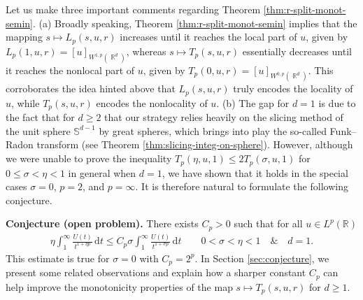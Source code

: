 \documentclass[12pt, reqno]{amsart}%
\theoremstyle{plain}  %
\theoremstyle{definition}  %
\theoremstyle{remark}
\numberwithin{equation}{section}
\DeclareMathOperator{\R}{\mathbb{R}}
\renewcommand{\d}{\,\mathrm{d}}
\begin{document}
Let us make three important comments regarding Theorem \ref{thm:r-split-monot-semin}. (a) Broadly speaking, Theorem \ref{thm:r-split-monot-semin} implies that the mapping $s \mapsto L_p(s,u,r)$ increases until it reaches the local part of $u$, given by $L_p(1,u,r) = [u]_{W^{1,p}(\R^d)}$, whereas $s \mapsto T_p(s,u,r)$ essentially decreases until it reaches the nonlocal part of $u$, given by $T_p(0,u,r) = [u]_{W^{0,p}(\R^d)}$. This corroborates the idea hinted above that $L_p(s,u,r)$ truly encodes the locality of $u$, while $T_p(s,u,r)$ encodes the nonlocality of $u$. (b) The gap for $d=1$ is due to the fact that for $d \geq 2$  that our strategy relies heavily  on the  slicing method of the unit sphere $\mathbb{S}^{d-1}$ by great spheres, which brings into play the so-called Funk–Radon transform (see Theorem \ref{thm:slicing-integ-on-sphere}). However, although we were unable to prove the inequality $T_p(\eta, u, 1) \le 2T_p(\sigma, u, 1)$ for $0 \le \sigma < \eta < 1$ in general when $d=1$, we have shown that it holds in the special cases $\sigma=0$, $p=2$, and $p=\infty$. It is therefore natural to formulate the following conjecture.

\medskip
\textbf{Conjecture (open problem).}
There exists $C_p > 0$ such that for all $u \in L^p(\mathbb{R})$
\begin{align*}
\eta\int_1^\infty\frac{U(t)}{t^{1+\eta p}}\d t\leq C_p  	\sigma \int_1^\infty\frac{U(t)}{t^{1+\sigma p}}\d t \qquad 0<\sigma<\eta<1 \quad \& \quad d=1.
\end{align*}
This estimate is true for $\sigma=0$ with $C_p=2^{p}$. In Section \ref{sec:conjecture}, we present some related observations  and explain how a sharper constant $C_p$ can help improve the monotonicity properties of the map $s \mapsto T_p(s,u,r)$ for $d \geq 1$.
\end{document}
